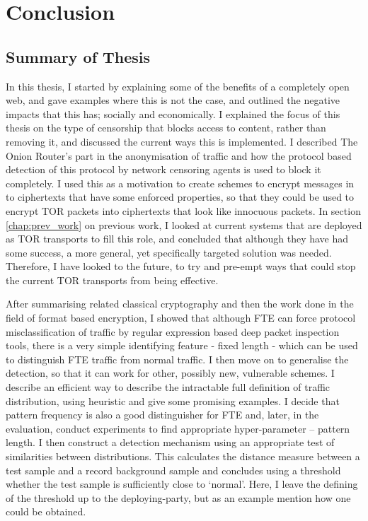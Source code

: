 \documentclass[ %
                    author={Samuel Russell},
                supervisor={Prof. Bogdan Warinschi},
                    degree={MEng},
                     title={Innocuous Ciphertexts},
                  subtitle={The DE-CENSOR Scheme},
                      type={Research},
                      year={2018} ]{dissertation}
\begin{document}

\chapter{Conclusion}
\label{chap:conclusion}

\section{Summary of Thesis}

In this thesis, I started by explaining some of the benefits of a completely open web, and gave examples where this is not the case, and outlined the negative impacts that this has; socially and economically.
I explained the focus of this thesis on the type of censorship that blocks access to content, rather than removing it, and discussed the current ways this is implemented.
I described The Onion Router's part in the anonymisation of traffic and how the protocol based detection of this protocol by network censoring agents is used to block it completely.
I used this as a motivation to create schemes to encrypt messages in to ciphertexts that have some enforced properties, so that they could be used to encrypt TOR packets into ciphertexts that look like innocuous packets.
In section \ref{chap:prev_work} on previous work, I looked at current systems that are deployed as TOR transports to fill this role, and concluded that although they have had some success, a more general, yet specifically targeted solution was needed.
Therefore, I have looked to the future, to try and pre-empt ways that could stop the current TOR transports from being effective.

After summarising related classical cryptography and then the work done in the field of format based encryption, I showed that although FTE can force protocol misclassification of traffic by regular expression based deep packet inspection tools, there is a very simple identifying feature - fixed length - which can be used to distinguish FTE traffic from normal traffic.
I then move on to generalise the detection, so that it can work for other, possibly new, vulnerable schemes.
I describe an efficient way to describe the intractable full definition of traffic distribution, using heuristic and give some promising examples.
I decide that pattern frequency is also a good distinguisher for FTE and, later, in the evaluation, conduct experiments to find appropriate hyper-parameter -- pattern length.
I then construct a detection mechanism using an appropriate test of similarities between distributions.
This calculates the distance measure between a test sample and a record background sample and concludes using a threshold whether the test sample is sufficiently close to `normal'.
Here, I leave the defining of the threshold up to the deploying-party, but as an example mention how one could be obtained.
\end{document}
